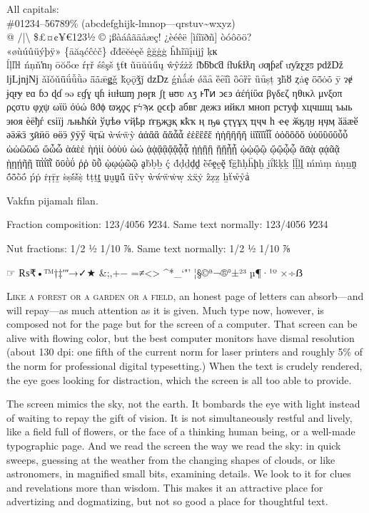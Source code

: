 \documentclass[a4paper,14pt]{memoir}
\begin{document}
{{
All capitals:\\
\#01234--56789\% (abcdefghijk-lmnop---qrstuv\textasciitilde{}wxyz)\\
@ /|\textbackslash{} \$£¤¢¥€123½
© ¡ßàáâãäåæç! ¿èéêë [ìíîïðñ] òóôõö?\\
«øùúûüýþÿ» \{āăąćĉċč\} ďđēĕėęě ĝğġģ ĥħĩīĭįıĳĵ ķĸ\\
ĺļľŀł ńņňŉŋ ōŏőœ ŕŗř śŝşš ţťŧ
ũūŭůűų ŵŷźżž ſƀƃƅƈƌ ƒƕƙƚƛƞ ơƣƥƨƭ ưƴƶƹƺƽ ƿǆǅ ǉǈǌǋ ǎǐǒǔǖǘǚǜǝ ǟǡǣǥǧ ǩǫǭǯǰ ǳǲ
ǵǹǻǽ ǿȁȃ ȅȇȉȋ ȍȏȑȓ ȕȗșț ȝȟȣ ȥȧȩ ȫȭȯȱ ȳ
ɂɇ ɉɋɍɏ ɐɑ ɓɔ ɖɗ ɘə
ɛɠɣ ɥɦ ɨɩɪɫɯɱ ɲɵɼʀ
ʃʈ ʉʊʋ ʌʒ
ͱͳͷ ͻͼͽ
άέήίΰα βγδεζ ηθικλ μνξοπ ρςστυ φχψ ωϊϋ
όύώ ϐϑϕ ϖϗϙϛ ϝϟϡϰ ϱϲϵϸ
абвг дежз ийкл мноп рстуф хцчшщ ъыь эюя
ѐёђѓ єѕіїј љњћќѝ ўџѣѳ ѵҋҍҏ ґғҕҗҙқ ҝҟҡ ң ҧҩ ҫҭүұҳ ҵҷҹ һ ҽҿ ӂӄӆӈ ӊӌӎ ӑӓӕӗ әӛӝӟ ӡӣӥӧ өӫӭ ӯӱӳ ӵӷӹ
ẁẃẅỳ
ἀἁἂἃ ἄἅἆἇ ἐἑἒἓἔἕ ἠἡἢἣἤἥ ἰἱἲἳἴἵἶἷ ὀὁὂὃὄὅ ὐὑὒὓὔὕὖὗ ὠὡὢὣὤ ὥὦὧ ὰάὲέ ὴήὶί ὸόὺύ ὼώ ᾀᾁᾂᾃᾄᾅᾆᾇ ᾐᾑᾒᾓ ᾔᾕᾖᾗ ᾠᾡᾢᾣ ᾤᾥᾦᾧ ᾰᾱᾲ ᾳᾴᾶᾷ
ῂῃῄῆῇ ῐῑῒΐῖῗ ῠῡῢΰ ῤῥ ῦῧ ῲῳῴῶῷ
ḁḃḅḇ ḉ ḋḍḏḑḓ ḕḗḙḛḝ ḟḡḣḥḧḩḫ ḭḯḱḳḵ ḷḹḻḽ ḿṁṃ ṅṇṉṋ ṍṏṑṓ ṕṗ ṙṛṝṟ ṡṣṥṧṩ ṫṭṯṱ ṳṵṷṹ ṻṽṿ ẁẃẅẇẉ ẋẍẏ ẑẓẕ ẖẗẘẙẚ

{Vakfın pijamalı filan.}
}

Fraction composition: {123/4056 ⅟234}. Same text normally: 123/4056 ⅟234

Nut fractions: {1/2 ½ 1/10 ⅞}. Same text normally: 1/2 ½ 1/10 ⅞

☞ ₨₹•™†‡ʹʺ→✓★ \&;,+− =≠<> \textasciicircum{}*\_`"'
¦§©ª¬®°±²³
µ¶·¹º ×÷ẞ

\newpage
}

\textsc{Like a forest or a garden or a field,} an honest page of letters can absorb---and will repay---as much attention as it is given. Much type now, however, is composed not for the page but for the screen of a computer. That screen can be alive with flowing color, but the best computer monitors have dismal resolution (about 130 dpi: one fifth of the current norm for laser printers and roughly 5\% of the norm for professional digital typesetting.) When the text is crudely rendered, the eye goes looking for distraction, which the screen is all too able to provide.

The screen mimics the sky, not the earth. It bombards the eye with light instead of waiting to repay the gift of vision. It is not simultaneously restful and lively, like a field full of flowers, or the face of a thinking human being, or a well-made typographic page. And we read the screen the way we read the sky: in quick sweeps, guessing at the weather from the changing shapes of clouds, or like astronomers, in magnified small bits, examining details. We look to it for clues and revelations more than wisdom. This makes it an attractive place for advertizing and dogmatizing, but not so good a place for thoughtful text.
\end{document}
